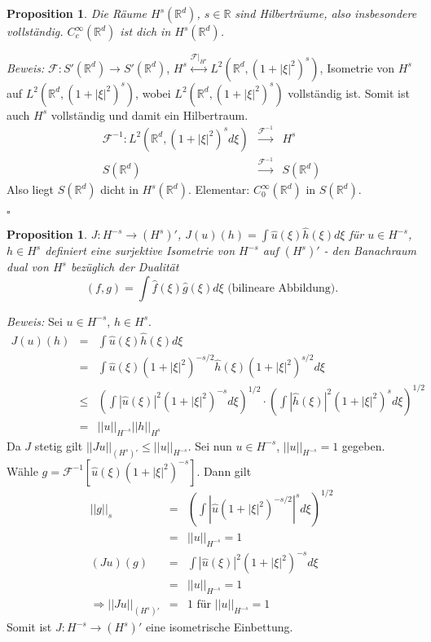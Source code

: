 \documentclass[11pt,a4paper,titlepage, ngerman]{scrartcl}
\newtheorem{Prop}[Satz]{Proposition}
\numberwithin{equation}{section}
\newcommand{\R}{\mathbb{R}} %
\newcommand{\f}{\hat{f}}
\newcommand{\g}{\hat{g}}
\newcommand{\F}{\mathcal{F}}
\newcommand{\m}{\cdot}
\newcommand{\Bew}{\emph{Beweis: }}
\newcommand{\qed}{\begin{flushright}
		$\square$
	\end{flushright}}
\begin{document}
	\begin{Prop}
		Die Räume $H^s(\R^d)$, $s\in \R$ sind Hilberträume, also insbesondere vollständig. $C_c^\infty(\R^d)$ ist dich in $H^s(\R^d)$.
	\end{Prop}
	
	\Bew $\F:S'(\R^d)\rightarrow S'(\R^d)$, $H^s\overset{\F|_{H^s}}{\leftrightarrow} L^2(\R^d, (1+|\xi|^2)^s)$, Isometrie von $H^s$ auf $L^2(\R^d, (1+|\xi|^2)^s)$, wobei $L^2(\R^d, (1+|\xi|^2)^s)$ vollständig ist. Somit ist auch $H^s$ vollständig und damit ein Hilbertraum.
	\begin{eqnarray}
		\F^{-1}: L^2(\R^d,(1+|\xi|^2)^s d\xi) &\overset{\F^{-1}}{\rightarrow}& H^s\nonumber\\
		S(\R^d)&\overset{\F^{-1}}{\rightarrow}& S(\R^d)\nonumber
	\end{eqnarray}
	Also liegt $S(\R^d)$ dicht in $H^s(\R^d)$. Elementar: $C_0^\infty(\R^d)$ in $S(\R^d)$.
	\qed
	
	\begin{Prop}
		$J:H^{-s}\rightarrow (H^s)'$, $J(u)(h) = \int \hat u(\xi) \hat h(\xi)d\xi$ für $u\in H^{-s}$, $h\in H^s$ definiert eine surjektive Isometrie von $H^{-s}$ auf $(H^s)'$ - den Banachraum dual von $H^s$ bezüglich der Dualität 
		$$(f,g) = \int \f(\xi)\g(\xi)d\xi \text{ (bilineare Abbildung)}.$$
	\end{Prop}
	
	\Bew Sei $u\in H^{-s}$, $h\in H^s$. 
	\begin{eqnarray}
		J(u)(h) &=& \int\hat u(\xi)\hat h(\xi)d\xi\nonumber\\
		&=& \int\hat u(\xi) (1+|\xi|^2)^{-s/2}\hat h(\xi)(1+|\xi|^2)^{s/2}d\xi\nonumber\\
		&\leq& \left(\int |\hat u(\xi)|^2 (1+|\xi|^2)^{-s} d\xi \right)^{1/2}\m \left(\int |\hat h(\xi)|^2 (1+|\xi|^2)^{s} d\xi \right)^{1/2}\nonumber\\
		&=& ||u||_{H^{-s}} ||h||_{H^s} \nonumber
	\end{eqnarray}
	Da $J$ stetig gilt $||J u||_{(H^s)'}\leq ||u||_{H^{-s}}$. Sei nun $u\in H^{-s}$, $||u||_{H^{-s}}= 1$ gegeben. Wähle $g = \F^{-1}[\hat u(\xi)(1+|\xi|^2)^{-s}]$. Dann gilt
	\begin{eqnarray}
		||g||_s &=& \left(\int|\hat u(1+|\xi|^2)^{-s/2}|^s d\xi \right)^{1/2}\nonumber\\
		&=& ||u||_{H^{-s}} = 1\nonumber\\
		(Ju)(g) &=& \int |\hat u(\xi)|^2(1+|\xi|^2)^{-s}d\xi\nonumber\\
		&=& ||u||_{H^{-s}} = 1\nonumber\\
		\Rightarrow ||Ju||_{(H^s)'} &=& 1\text{ für } ||u||_{H^{-s}} = 1\nonumber
	\end{eqnarray}
	Somit ist $J:H^{-s}\rightarrow (H^s)'$ eine isometrische Einbettung. 
	
\end{document}
